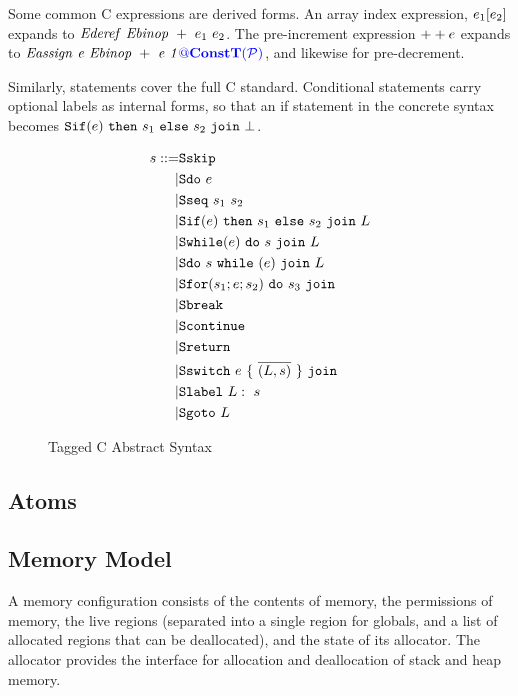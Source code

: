 \documentclass{llncs}
\begin{document}
Some common C expressions are derived forms. An array index expression,
\(e_1[e_2]\) expands to \(\mathit{Ederef} ~ \mathit{Ebinop} ~ + ~ e_1 ~ e_2\).
The pre-increment  expression \(++e\) expands to
\(\mathit{Eassign ~ e ~ \mathit{Ebinop} ~ + ~ e ~ 1{\color{blue} @}\color{blue} \mathbf{ConstT}(\mathcal{\color{blue} P\mathit{}})}\), and likewise for pre-decrement.

Similarly, statements cover the full C standard. Conditional statements
carry optional labels as internal forms, so that an if statement in the
concrete syntax becomes \(\mathtt{Sif}(e) ~ \mathtt{then} ~ s_1 ~ \mathtt{else} ~ s_2 ~ \mathtt{join} ~ \bot\).

\begin{figure}
  \begin{subfigure}[t]{0.3\textwidth}
    \[\begin{aligned}
    s ::= & \mathtt{Sskip} \\
    | & \mathtt{Sdo} ~ e \\
    | & \mathtt{Sseq} ~ s_1 ~ s_2 \\
    | & \mathtt{Sif}(e) ~ \mathtt{then} ~ s_1 ~ \mathtt{else} ~ s_2 ~ \mathtt{join} ~ L \\
    | & \mathtt{Swhile}(e) ~ \mathtt{do} ~ s ~ \mathtt{join} ~ L \\
    | & \mathtt{Sdo} ~ s ~ \mathtt{while} ~ (e) ~ \mathtt{join} ~ L \\
    | & \mathtt{Sfor}(s_1; e; s_2) ~ \mathtt{do} ~ s_3 ~ \mathtt{join} ~ \\
    | & \mathtt{Sbreak} \\
    | & \mathtt{Scontinue} \\
    | & \mathtt{Sreturn} ~ \\
    | & \mathtt{Sswitch} ~ e ~ \{ ~ \overline{(L,s)} ~ \} ~ \mathtt{join} ~ \\
    | & \mathtt{Slabel} ~ L: ~ s \\
    | & \mathtt{Sgoto} ~ L \\    
    \end{aligned}\]
  \end{subfigure}
  \begin{subfigure}[t]{0.69\textwidth}
  \end{subfigure}
  \caption{Tagged C Abstract Syntax}
  \label{fig:syntax}
\end{figure}

\subsection{Atoms}

\subsection{Memory Model}

A memory configuration consists of the contents of memory, the permissions
of memory, the live regions
(separated into a single region for globals, and a list of allocated regions
that can be deallocated), and the state of its allocator. The allocator
provides the interface for allocation and deallocation of stack and heap memory.
\end{document}
